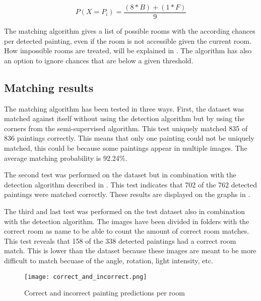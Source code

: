 \begin{equation}
    \label{eq:histogram-score}
    P(X = P_{i}) = \frac{(8 * B) + (1 * F)}{9}
\end{equation}

The matching algorithm gives a list of possible rooms with the according chances per detected painting, even if the room is not accessible given the current room. How impossible rooms are treated, will be explained in . The algorithm has also an option to ignore chances that are below a given threshold.

\subsection{Matching results}
The matching algorithm has been tested in three ways. First, the dataset was matched against itself without using the detection algorithm but by using the corners from the semi-supervised algorithm. This test uniquely matched 835 of 836 paintings correctly. This means that only one painting could not be uniquely matched, this could be because some paintings appear in multiple images. The average matching probability is 92.24\%.

The second test was performed on the dataset but in combination with the detection algorithm described in . This test indicates that 702 of the 762 detected paintings were matched correctly. These results are displayed on the graphs in .

The third and last test was performed on the test dataset also in combination with the detection algorithm. The images have been divided in folders with the correct room as name to be able to count the amount of correct room matches. This test reveals that 158 of the 338 detected paintings had a correct room match. This is lower than the dataset because these images are meant to be more difficult to match becuase of the angle, rotation, light intensity, etc.

\begin{figure}
    \centering
    \texttt{[image: correct\_and\_incorrect.png]}

    \caption{Correct and incorrect painting predictions per room}
    \label{fig:correct-incorrect-paintings}
\end{figure}
